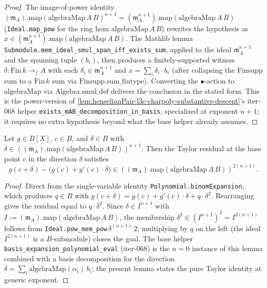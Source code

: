 \begin{proof}

\leanok
The image-of-power identity
$(\mathfrak m_A).\mathrm{map}(\mathrm{algebraMap}\,A\,B)^{n+1} =
 (\mathfrak m_A^{n+1}).\mathrm{map}(\mathrm{algebraMap}\,A\,B)$
(\texttt{Ideal.map\_pow} for the ring hom $\mathrm{algebraMap}\,A\,B$)
rewrites the hypothesis as $x \in (\mathfrak m_A^{n+1}).\mathrm{map}
(\mathrm{algebraMap}\,A\,B)$. The Mathlib lemma
\texttt{Submodule.mem\_ideal\_smul\_span\_iff\_exists\_sum},
applied to the ideal $\mathfrak m_A^{n+1}$ and the spanning tuple
$(b_i)$, then produces a finitely-supported witness
$\delta : \mathrm{Fin}\,k \to_f A$ with each $\delta_i \in
\mathfrak m_A^{n+1}$ and
$x = \sum_i \delta_i \cdot b_i$ (after collapsing the Finsupp sum
to a $\mathrm{Fin}\,k$ sum via $\mathrm{Finsupp.sum\_fintype}$). Converting the $\bullet$-action to
$\mathrm{algebraMap}$ via $\mathrm{Algebra.smul\_def}$ delivers
the conclusion in the stated form. This is the power-version of
\cref{lem:henselianPair-l3c-charpoly-substantive-descent}'s
iter-068 helper \texttt{exists\_mAB\_decomposition\_in\_basis},
specialized at exponent $n+1$; it requires no extra hypothesis
beyond what the base helper already assumes.
\end{proof}

\begin{lemma}
\label{lem:henselianPair-polynomial-eval-taylor-residual-pow}
Let $g \in B[X]$, $c \in B$, and $\delta \in B$ with
$\delta \in ((\mathfrak m_A).\mathrm{map}(\mathrm{algebraMap}\,A\,B))^{n+1}$.
Then the Taylor residual at the base point $c$ in the direction $\delta$
satisfies
\[
g(c + \delta) - \bigl(g(c) + g'(c)\cdot\delta\bigr) \in
  ((\mathfrak m_A).\mathrm{map}(\mathrm{algebraMap}\,A\,B))^{2(n+1)}.
\]
\end{lemma}

\begin{proof}


\leanok
Direct from the single-variable identity
\texttt{Polynomial.binomExpansion}, which produces $q \in B$ with
$g(c + \delta) = g(c) + g'(c)\cdot\delta + q\cdot\delta^2$. Rearranging
gives the residual equal to $q\cdot\delta^2$. Since
$\delta \in I^{n+1}$ with $I := (\mathfrak m_A).\mathrm{map}
(\mathrm{algebraMap}\,A\,B)$, the membership
$\delta^2 \in (I^{n+1})^2 = I^{2(n+1)}$ follows from
\texttt{Ideal.pow\_mem\_pow}\,$\delta^{(n+1)}\,2$; multiplying by $q$
on the left (the ideal $I^{2(n+1)}$ is a $B$-submodule) closes the goal.
The base helper \texttt{basis\_expansion\_polynomial\_eval} (iter-068)
is the $n = 0$ instance of this lemma combined with a basis
decomposition for the direction $\delta = \sum_i \mathrm{algebraMap}
(\alpha_i)\,b_i$; the present lemma states the pure Taylor identity at
generic exponent.
\end{proof}

